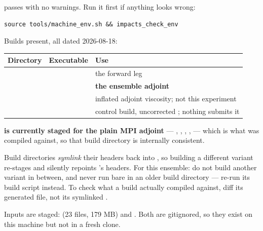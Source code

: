  passes with no warnings. Run it first if anything
looks wrong:

\begin{center}
\footnotesize
\begin{verbatim}
source tools/machine_env.sh && impacts_check_env
\end{verbatim}
\end{center}

Builds present, all dated 2026-08-18:

\begin{center}
\begin{tabularx}{\textwidth}{@{}Y{1.05}Y{0.75}Y{1.2}@{}}
\toprule
\textbf{Directory} & \textbf{Executable} & \textbf{Use}\\
\midrule
{} &  & the forward leg\\
 & 
  & \textbf{the ensemble adjoint}\\
 & 
  & inflated adjoint viscosity; not this experiment\\
 & 
  & control build, uncorrected ; nothing submits it\\
\bottomrule
\end{tabularx}
\end{center}

\begin{callout}
\textbf{ is currently staged for the plain MPI adjoint} ---
, , ,
,  ---
which is what  was compiled against, so that build directory
is internally consistent.

Build directories \emph{symlink} their headers back into , so
building a different variant re-stages  and silently repoints
's headers. For this ensemble: do not build another variant
in between, and never run bare  in an older build directory ---
re-run its build script instead. To check what a build actually compiled against,
diff its generated  file, not its symlinked .
\end{callout}

Inputs are staged:  (23 files, 179 MB) and
. Both are gitignored, so they exist on
this machine but not in a fresh clone.

